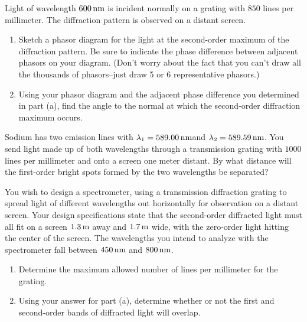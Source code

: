 \begin{problem}
  Light of  wavelength $600\,\mbox{nm}$ is  incident normally on a grating  with $850$
  lines per millimeter. The diffraction pattern is observed on a distant screen.
\begin{enumerate}

\item  Sketch a  phasor  diagram  for the  light  at the  second-order
  maximum of the  diffraction pattern.  Be sure to  indicate the phase
  difference between  adjacent phasors on your  diagram.  (Don't worry
  about  the   fact  that  you   can't  draw  all  the   thousands  of
  phasors--just draw 5 or 6 representative phasors.)

\item Using your phasor diagram and the adjacent phase difference you determined
in part (a), find the angle to the normal at which the second-order diffraction
maximum occurs.
\end{enumerate}
\end{problem}


\begin{problem}
 Sodium   has  two   emission   lines  with
  $\lambda_1=589.00\,\mbox{nm}$and  $\lambda_2=589.59\,\mbox{nm}$.   
You  send light
made up of both wavelengths through a transmission grating with $1000$ lines
per millimeter and onto a screen one meter distant.  By what distance
will the first-order bright spots formed by the two wavelengths be separated?
\end{problem}

\begin{problem}
  You wish  to design a spectrometer, using  a transmission diffraction
  grating to spread light of different wavelengths out horizontally
for observation on a
distant screen.
Your design specifications state  that 
the second-order diffracted light must all fit on a
  screen $1.3\,\mbox{m}$  away and $1.7\,\mbox{m}$ wide, with the zero-order light hitting
the center of the screen.  The wavelengths  you intend to  analyze with
  the spectrometer fall between $450\,\mbox{nm}$ and $800\,\mbox{nm}$.
%
\begin{enumerate}

\item Determine the maximum  allowed number of lines per millimeter
for the grating.
\item Using your answer for part (a), determine whether or not  the first and second-order bands of diffracted light will overlap.
\end{enumerate}
\end{problem}

